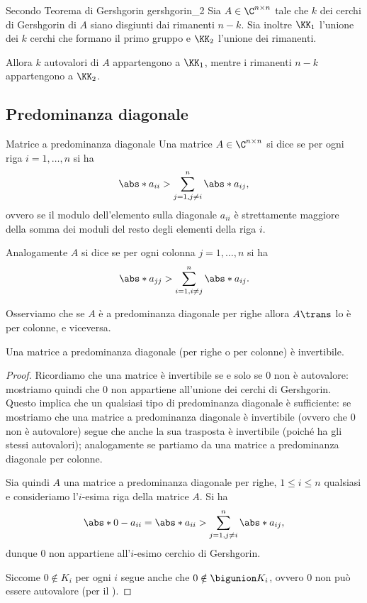 \begin{theorem}
    {Secondo Teorema di Gershgorin}
    {gershgorin_2}
    Sia $A \in \Mat{\C, n, n}$ tale che $k$ dei cerchi di Gershgorin di $A$ siano disgiunti dai rimanenti $n-k$. Sia inoltre $\KK_1$ l'unione dei $k$ cerchi che formano il primo gruppo e $\KK_2$ l'unione dei rimanenti.

    Allora $k$ autovalori di $A$ appartengono a $\KK_1$, mentre i rimanenti $n-k$ appartengono a $\KK_2$. 
\end{theorem}

\subsection{Predominanza diagonale}

\begin{definition}
    {Matrice a predominanza diagonale}
    Una matrice $A \in \Mat{\C, n, n}$ si dice  se per ogni riga $i = 1, \dots, n$ si ha \[
        \abs*{a_{ii}} > \sum_{j=1, j\neq i}^n \abs*{a_{ij}},
    \] ovvero se il modulo dell'elemento sulla diagonale $a_{ii}$ è strettamente maggiore della somma dei moduli del resto degli elementi della riga $i$.

    Analogamente $A$ si dice  se per ogni colonna $j = 1, \dots, n$ si ha \[
        \abs*{a_{jj}} > \sum_{i=1, i\neq j}^n \abs*{a_{ij}}.
    \] 
\end{definition}

Osserviamo che se $A$ è a predominanza diagonale per righe allora $A\trans$ lo è per colonne, e viceversa.

\begin{proposition}{}{}
    Una matrice a predominanza diagonale (per righe o per colonne) è invertibile.
\end{proposition}
\begin{proof}
    Ricordiamo che una matrice è invertibile se e solo se $0$ non è autovalore: mostriamo quindi che $0$ non appartiene all'unione dei cerchi di Gershgorin.
    Questo implica che un qualsiasi tipo di predominanza diagonale è sufficiente: se mostriamo che una matrice a predominanza diagonale è invertibile (ovvero che $0$ non è autovalore) segue che anche la sua trasposta è invertibile (poiché ha gli stessi autovalori); analogamente se partiamo da una matrice a predominanza diagonale per colonne.

    Sia quindi $A$ una matrice a predominanza diagonale per righe, $1 \leq i \leq n$ qualsiasi e consideriamo l'$i$-esima riga della matrice $A$. Si ha \[
        \abs*{0 - a_{ii}} = \abs*{a_{ii}} > \sum_{j=1, j\neq i}^n \abs*{a_{ij}},
    \] dunque $0$ non appartiene all'$i$-esimo cerchio di Gershgorin.

    Siccome $0 \notin K_i$ per ogni $i$ segue anche che $0 \notin \bigunion K_i$, ovvero $0$ non può essere autovalore (per il ).
\end{proof}